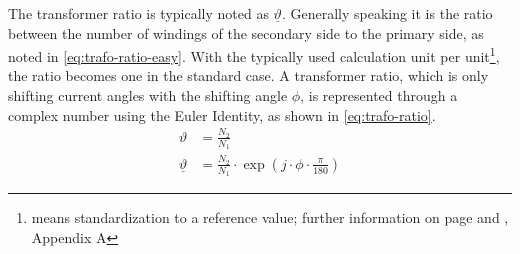 The transformer ratio is typically noted as $\underline{\vartheta}$. Generally speaking it is the ratio between the number of windings of the secondary side to the primary side, as noted in \autoref{eq:trafo-ratio-easy}. With the typically used calculation unit \glqq per unit\grqq\footnote{means standardization to a reference value; further information on page \pageref{chap:symbols} and \textcite{machowskiPowerSystemDynamics2020}, Appendix A}, the ratio becomes one in the standard case. A transformer ratio, which is only shifting current angles with the shifting angle $\phi$, is represented through a complex number using the Euler Identity, as shown in \autoref{eq:trafo-ratio}.
\begin{align}
    \vartheta&=\frac{N_2}{N_1} \label{eq:trafo-ratio-easy} \\[6pt]
    \underline{\vartheta}&=\frac{N_2}{N_1} \cdot \exp(j \cdot \phi \cdot \frac{\pi}{180})\label{eq:trafo-ratio}
\end{align}


